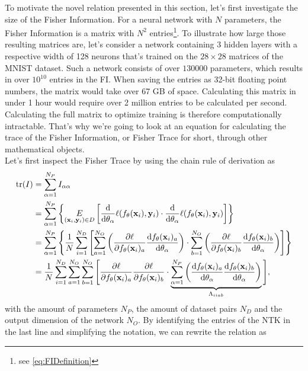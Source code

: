 To motivate the novel relation presented in this section, let's first investigate the size of the Fisher Information. For a neural network with $N$ parameters, the Fisher Information is a matrix with $N^2$ entries\footnote{see \cref{eq:FIDefinition}}. To illustrate how large those resulting matrices are, let's consider a network containing 3 hidden layers with a respective width of 128 neurons that's trained on the $28\times28$ matrices of the MNIST dataset. Such a network consists of over $130000$ parameters, which results in over $10^{10}$ entries in the FI. When saving the entries as 32-bit floating point numbers, the matrix would take over 67 GB of space. Calculating  this matrix in under 1 hour would require over 2 million entries to be calculated per second. Calculating the full matrix to optimize training is therefore computationally intractable. That's why we're going to look at an equation for calculating the trace of the Fisher Information, or Fisher Trace for short, through other mathematical objects.\\
Let's first inspect the Fisher Trace by using the chain rule of derivation as
\begin{equation}
	\begin{split}
		\mathrm{tr}(I) &= \sum_{\alpha = 1}^{N_P} I_{\alpha\alpha}\\
		&= \sum_{\alpha = 1}^{N_P} \left\{\underset{(\mathbf{x}_i, \mathbf{y}_i) \in D}{E} \left[\frac{\mathrm{d}}{\mathrm{d}\theta_\alpha}\ell(f_\theta(\mathbf{x}_i),\mathbf{y}_i)\cdot \frac{\mathrm{d}}{\mathrm{d}\theta_\alpha}\ell(f_\theta(\mathbf{x}_i),\mathbf{y}_i)\right]\right\}\\
		&= \sum_{\alpha = 1}^{N_P} \left\{ \frac{1}{N} \sum_{i = 1}^{N_D} \left[\sum_{a=1}^{N_O}\left(\frac{\partial\ell}{\partial f_\theta(\mathbf{x}_i)_a}\frac{\mathrm{d}f_\theta(\mathbf{x}_i)_a}{\mathrm{d}\theta_\alpha}\right)\cdot\sum_{b=1}^{N_O}\left(\frac{\partial\ell}{\partial f_\theta(\mathbf{x}_i)_b}\frac{\mathrm{d}f_\theta(\mathbf{x}_i)_b}{\mathrm{d}\theta_\alpha}\right)\right]\right\}\\
		&= \frac{1}{N} \sum_{i = 1}^{N_D} \sum_{a=1}^{N_O} \sum_{b=1}^{N_O} \Bigg[\frac{\partial\ell}{\partial f_\theta(\mathbf{x}_i)_a}\frac{\partial\ell}{\partial f_\theta(\mathbf{x}_i)_b} \cdot\underbrace{ \sum_{\alpha = 1}^{N_P} \left(\frac{\mathrm{d}f_\theta(\mathbf{x}_i)_a}{\mathrm{d}\theta_\alpha}\frac{\mathrm{d}f_\theta(\mathbf{x}_i)_b}{\mathrm{d}\theta_\alpha}\right)}_{\Lambda_{iiab}}\Bigg],
	\end{split} 
\end{equation}
with the amount of parameters $N_P$, the amount of dataset pairs $N_D$ and the output dimension of the network $N_O$. By identifying the entries of the NTK in the last line and simplifying the notation, we can rewrite the relation as
